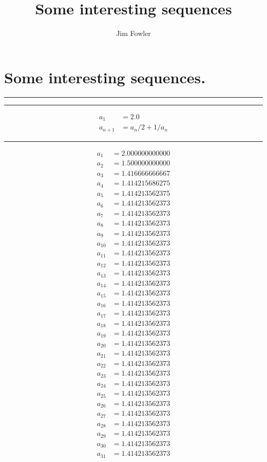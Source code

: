 \documentclass[10pt,letterpaper]{article}
\title{Some interesting sequences}
\author{Jim Fowler}
\begin{document}
\section*{Some interesting sequences.}

\begin{multicols}{4}
\hrule
\hrule
\begin{align*}
a_1 &= 2.0 \\
a_{n+1} &= a_n/2 + 1/a_n
\end{align*}
\hrule
\begin{align*}
a_{1} &= 2.000000000000 \\
a_{2} &= 1.500000000000 \\
a_{3} &= 1.416666666667 \\
a_{4} &= 1.414215686275 \\
a_{5} &= 1.414213562375 \\
a_{6} &= 1.414213562373 \\
a_{7} &= 1.414213562373 \\
a_{8} &= 1.414213562373 \\
a_{9} &= 1.414213562373 \\
a_{10} &= 1.414213562373 \\
a_{11} &= 1.414213562373 \\
a_{12} &= 1.414213562373 \\
a_{13} &= 1.414213562373 \\
a_{14} &= 1.414213562373 \\
a_{15} &= 1.414213562373 \\
a_{16} &= 1.414213562373 \\
a_{17} &= 1.414213562373 \\
a_{18} &= 1.414213562373 \\
a_{19} &= 1.414213562373 \\
a_{20} &= 1.414213562373 \\
a_{21} &= 1.414213562373 \\
a_{22} &= 1.414213562373 \\
a_{23} &= 1.414213562373 \\
a_{24} &= 1.414213562373 \\
a_{25} &= 1.414213562373 \\
a_{26} &= 1.414213562373 \\
a_{27} &= 1.414213562373 \\
a_{28} &= 1.414213562373 \\
a_{29} &= 1.414213562373 \\
a_{30} &= 1.414213562373 \\
a_{31} &= 1.414213562373 \\

\end{align*}
\end{multicols}
\end{document}
